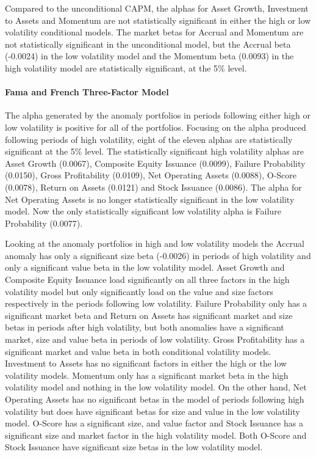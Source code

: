 \documentclass[a4paper,12pt]{article}                 %
\begin{document}
Compared to the unconditional CAPM, the alphas for Asset Growth, Investment to Assets and Momentum are not statistically significant in either the high or low volatility conditional models. The market betas for Accrual and Momentum are not statistically significant in the unconditional model, but the Accrual beta (-0.0024) in the low volatility model and the Momentum beta (0.0093) in the high volatility model are statistically significant, at the 5\% level. 

\paragraph{Fama and French Three-Factor Model}
The alpha generated by the anomaly portfolios in periods following either high or low volatility is positive for all of the portfolios. Focusing on the alpha produced following periods of high volatility, eight of the eleven alphas are statistically significant at the 5\% level. The statistically significant high volatility alphas are Asset Growth (0.0067), Composite Equity Issuance (0.0099), Failure Probability (0.0150), Gross Profitability (0.0109), Net Operating Assets (0.0088), O-Score (0.0078), Return on Assets (0.0121) and Stock Issuance (0.0086). The alpha for Net Operating Assets is no longer statistically significant in the low volatility model. Now the only statistically significant low volatility alpha is Failure Probability (0.0077). 

Looking at the anomaly portfolios in high and low volatility models the Accrual anomaly has only a significant size beta (-0.0026) in periods of high volatility and only a significant value beta in the low volatility model. Asset Growth and Composite Equity Issuance load significantly on all three factors in the high volatility model but only significantly load on the value and size factors respectively in the periods following low volatility. Failure Probability only has a significant market beta and Return on Assets has significant market and size betas in periods after high volatility, but both anomalies have a significant market, size and value beta in periods of low volatility. Gross Profitability has a significant market and value beta in both conditional volatility models. Investment to Assets has no significant factors in either the high or the low volatility models. Momentum only has a significant market beta in the high volatility model and nothing in the low volatility model. On the other hand, Net Operating Assets has no significant betas in the model of periods following high volatility but does have significant betas for size and value in the low volatility model. O-Score has a significant size, and value factor and Stock Issuance has a significant size and market factor in the high volatility model. Both O-Score and Stock Issuance have significant size betas in the low volatility model.
\end{document}

